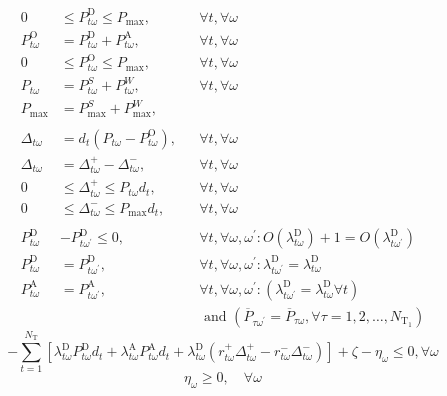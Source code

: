 \begin{align}
0 &\leq P_{t \omega}^{\mathrm{D}} \leq P_{\mathrm{max}}, &  &\forall t, \forall \omega \\
P_{t \omega}^{\mathrm{O}}&=P_{t \omega}^{\mathrm{D}}+P_{t \omega}^{\mathrm{A}},&  &\forall t, \forall \omega \\
0 &\leq P_{t \omega}^{\mathrm{O}} \leq P_{\max }, & & \forall t, \forall \omega \\
P_{t\omega}&= P_{t\omega}^S+P_{t\omega}^W, & &\forall t,\forall \omega \\
P_{\max}&= P^{S}_{\max}+P^{W}_{\max},  \\
\nonumber \\
\Delta_{t \omega}&=d_{t}\left(P_{t \omega}-P_{t \omega}^{\mathrm{O}}\right), &&\forall t, \forall \omega \\
\Delta_{t \omega}&=\Delta_{t \omega}^{+}-\Delta_{t \omega}^{-}, &&\forall t, \forall \omega \\
0& \leq \Delta_{t \omega}^{+} \leq P_{t \omega} d_{t}, &&\forall t, \forall \omega \\
0& \leq \Delta_{t \omega}^{-} \leq P_{\max } d_{t}, &&\forall t, \forall \omega \\
\nonumber \\
P_{t \omega}^{\mathrm{D}}&-P_{t \omega^{\prime}}^{\mathrm{D}} \leq 0, && \forall t, \forall \omega, \omega^{\prime}: O\left(\lambda_{t \omega}^{\mathrm{D}}\right)+1=O\left(\lambda_{t \omega^{\prime}}^{\mathrm{D}}\right) \\
P_{t \omega}^{\mathrm{D}}&=P_{t \omega^{\prime}}^{\mathrm{D}}, && \forall t, \forall \omega, \omega^{\prime}: \lambda_{t \omega^{\prime}}^{\mathrm{D}}=\lambda_{t \omega}^{\mathrm{D}} \\
P_{t \omega}^{\mathrm{A}}&=P_{t \omega^{\prime}}^{\mathrm{A}},&& \forall t, \forall \omega, \omega^{\prime}:\left(\lambda_{t \omega^{\prime}}^{\mathrm{D}}=\lambda_{t \omega}^{\mathrm{D}} \forall t\right) \nonumber \\
& &&\text { and } \left(\overline{P}_{\tau \omega^{\prime}}=\overline{P}_{\tau \omega}, \forall \tau=1,2, \ldots, N_{\mathrm{T}_{1}}\right) 
\end{align}
\begin{equation}
-\sum_{t=1}^{N_{\mathrm{T}}}\left[\lambda_{t \omega}^{\mathrm{D}} P_{t \omega}^{\mathrm{D}} d_{t}+\lambda_{t \omega}^{\mathrm{A}} P_{t \omega}^{\mathrm{A}} d_{t}+\lambda_{t \omega}^{\mathrm{D}}\left(r_{t \omega}^{+} \Delta_{t \omega}^{+}-r_{t \omega}^{-} \Delta_{t \omega}^{-}\right)\right]+\zeta-\eta_{\omega} \leq 0, \forall \omega
\end{equation}
\begin{equation}
\eta_{\omega} \geq 0, \quad \forall \omega
\end{equation}